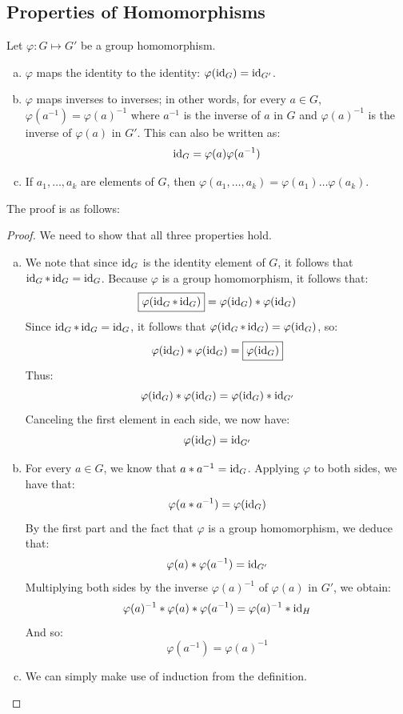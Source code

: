 \documentclass[letterpaper]{article}
\begin{document}
\subsection{Properties of Homomorphisms}
\begin{mdframed}
    \begin{proposition}
        Let $\varphi: G \mapsto G'$ be a group homomorphism. 
        \begin{enumerate}[(a)]
            \item $\varphi$ maps the identity to the identity: $\varphi(\operatorname{id}_G) = \operatorname{id}_{G'}$. 
            \item $\varphi$ maps inverses to inverses; in other words, for every $a \in G$, $\varphi(a^{-1}) = \varphi(a)^{-1}$ where $a^{-1}$ is the inverse of $a$ in $G$ and $\varphi(a)^{-1}$ is the inverse of $\varphi(a)$ in $G'$. This can also be written as: 
            \[\operatorname{id}_G = \varphi(a) \varphi(a^{-1})\]
            \item If $a_1, \dots, a_k$ are elements of $G$, then $\varphi(a_1, \dots, a_k) = \varphi(a_1) \dots \varphi(a_k)$. 
        \end{enumerate}
    \end{proposition}
\end{mdframed}

The proof is as follows: 
\begin{mdframed}
    \begin{proof}
        We need to show that all three properties hold. 
        \begin{enumerate}[(a)]
            \item We note that since $\operatorname{id}_G$ is the identity element of $G$, it follows that $\operatorname{id}_G * \operatorname{id}_G = \operatorname{id}_G$. Because $\varphi$ is a group homomorphism, it follows that: 
            \[\boxed{\varphi(\operatorname{id}_G * \operatorname{id}_G)} = \varphi(\operatorname{id}_G) * \varphi(\operatorname{id}_G)\]
            Since $\operatorname{id}_G * \operatorname{id}_G = \operatorname{id}_G$, it follows that $\varphi(\operatorname{id}_G * \operatorname{id}_G) = \varphi(\operatorname{id}_G)$, so: 
            \[\varphi(\operatorname{id}_G) * \varphi(\operatorname{id}_G) = \boxed{\varphi(\operatorname{id}_G)}\]
            Thus: 
            \[\varphi(\operatorname{id}_G) * \varphi(\operatorname{id}_G) = \varphi(\operatorname{id}_G) * \operatorname{id}_{G'}\]
            Canceling the first element in each side, we now have: 
            \[\varphi(\operatorname{id}_G) = \operatorname{id}_{G'}\]

            \item For every $a \in G$, we know that $a * a^{-1} = \operatorname{id}_G$. Applying $\varphi$ to both sides, we have that: 
            \[\varphi(a * a^{-1}) = \varphi(\operatorname{id}_G)\]
            By the first part and the fact that $\varphi$ is a group homomorphism, we deduce that: 
            \[\varphi(a) * \varphi(a^{-1}) = \operatorname{id}_{G'}\]
            Multiplying both sides by the inverse $\varphi(a)^{-1}$ of $\varphi(a)$ in $G'$, we obtain: 
            \[\varphi(a)^{-1} * \varphi(a) * \varphi(a^{-1}) = \varphi(a)^{-1} * \operatorname{id}_H\]
            And so:
            \[\varphi(a^{-1}) = \varphi(a)^{-1}\]

            \item We can simply make use of induction from the definition. \qedhere
        \end{enumerate}
    \end{proof}
\end{mdframed}
\end{document}
